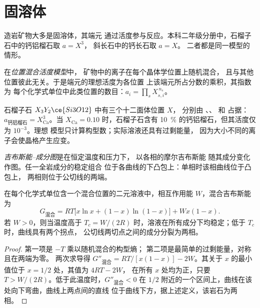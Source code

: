 \section{固溶体}\label{sec:b3:petrological-thermodynamics:solutions}

造岩矿物大多是固溶体，其端元
通过活度参与反应。本科二年级分册中，石榴子石中的钙铝榴石取 $a = X^3$，
斜长石中的钙长石取 $a = X$。
二者都是同一模型的情形。

\begin{definition}[位置混合活度模型]\label{def:b3:petrological-thermodynamics:site-mixing}
在\emph{位置混合活度模型}中，
矿物中的离子在每个晶体学位置上随机混合，
且与其他位置彼此无关。于是端元的理想活度为各位置
上该端元所占分数的乘积，其指数为
每个化学式单位中此类位置的数目：$a_i = \prod_s X_{s,i}^{\,n_s}$。
\end{definition}

石榴子石 $X_3Y_2\ce{Si3O12}$ 中有三个十二面体位置 $X$，
分别由 、、 和  占据：$a_{\text{钙铝榴石}} =
X_{\text{Ca}}^3$。当 $X_{\text{Ca}} = 0.10$ 时，石榴子石含有
\qty{10}{\percent} 的钙铝榴石，但其活度仅为 $10^{-3}$。理想
模型只计算构型数；实际溶液还具有过剩能量，
因为大小不同的离子会使晶格产生应变。

\begin{definition}\label{def:b3:petrological-thermodynamics:gx}
\emph{吉布斯能–成分图}是在恒定温度和压力下，
以各相的摩尔吉布斯能
随其成分变化作图。任一全岩成分的稳定组合
位于各曲线的下凸包上：单相时该相曲线位于凸包上，
两相则位于公切线的两端。
\end{definition}

\begin{proposition}[正规溶液]\label{prop:b3:petrological-thermodynamics:regular}
在每个化学式单位含一个混合位置的二元溶液中，相互作用能
$W$，混合吉布斯能为
\[
  G_{\text{混合}} = RT\bigl[x\ln x + (1 - x)\ln(1 - x)\bigr] + Wx(1 - x).
\]
若 $W > 0$，则当温度高于 $T_c =
W/(2R)$ 时，溶液在所有成分下均稳定；低于 $T_c$ 时，曲线具有两个拐点，
公切线两切点之间的成分分裂为两相。
\end{proposition}

\begin{proof}
第一项是 $-T$ 乘以随机混合的构型熵；
第二项是最简单的过剩能量，对称且在两端为零。
两次求导得 $G''_{\text{混合}} = RT/[x(1 - x)] - 2W$。其关于
$x$ 的最小值位于 $x = 1/2$ 处，其值为 $4RT - 2W$，
在所有 $x$ 处均为正，只要 $T > W/(2R)$。低于此温度时，$G''_{\text{混合}} < 0$ 在
$1/2$ 附近的一个区间上，曲线在该处向下弯曲，曲线上两点间的直线
位于曲线下方，据上述定义，该岩石为两
相。
\end{proof}

